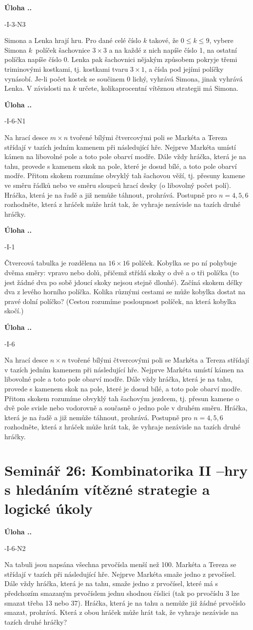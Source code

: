 \documentclass{article}
\newcounter{seminar}
\newcounter{problem}
\newcommand{\seminar}[2]{
  \clearpage
  \setcounter{seminar}{#1}
  \setcounter{problem}{0}
  \section*{Seminář #1: #2}
}
\newcommand{\source}[1]{
  \def\temp{#1}\ifx\temp\empty
  \else
    [#1]
  \fi
}
\newcommand{\problem}[4]{
  \stepcounter{problem}
  \noindent\textbf{Úloha \theseminar .\theproblem.}
    \source{#1} #3
  \bigskip
}
\begin{document}
\problem{64-I-3-N3}{}{
Simona a Lenka hrají hru. Pro dané celé číslo $k$ takové, že $0 \leq k \leq 9$, vybere Simona $k$~políček šachovnice $3 \times 3$ a na každé z nich napíše číslo 1, na ostatní políčka napíše číslo 0. Lenka pak šachovnici nějakým způsobem pokryje třemi triminovými kostkami, tj. kostkami tvaru $3 \times 1$, a čísla pod jejími políčky vynásobí. Je-li počet kostek se součinem 0 lichý, vyhrává Simona, jinak vyhrává Lenka. V závislosti na $k$ určete, kolikaprocentní vítěznou strategii má Simona.
}{
}

\problem{61-I-6-N1}{}{
Na hrací desce $m \times n$ tvořené bílými čtvercovými poli se Markéta a Tereza střídají v tazích jedním kamenem při následující hře. Nejprve Markéta umístí kámen na libovolné pole a toto pole obarví modře. Dále vždy hráčka, která je na tahu, provede s kamenem skok na pole, které je dosud bílé, a toto pole obarví modře. Přitom skokem rozumíme obvyklý tah šachovou věží, tj. přesuny kamene ve směru řádků nebo ve směru sloupců hrací desky (o libovolný počet polí). Hráčka, která je na řadě a již nemůže táhnout, prohrává. Postupně pro $n = 4, 5, 6$ rozhodněte, která z hráček může hrát tak, že vyhraje nezávisle na tazích druhé hráčky.
}{
}

\problem{62-I-1}{}{
Čtvercová tabulka je rozdělena na $16 \times 16$ políček. Kobylka se po ní pohybuje dvěma směry: vpravo nebo dolů, přičemž střídá skoky o dvě a o tři políčka (to jest žádné dva po sobě jdoucí skoky nejsou stejně dlouhé). Začíná skokem délky dva z levého horního políčka. Kolika různými cestami se může kobylka dostat na pravé dolní políčko? (Cestou rozumíme posloupnost políček, na která kobylka skočí.)
}{
}

\problem{61-I-6}{}{
Na hrací desce $n \times n$ tvořené bílými čtvercovými poli se Markéta a Tereza střídají v tazích jedním kamenem při následující hře. Nejprve Markéta umístí kámen na libovolné pole a toto pole obarví modře. Dále vždy hráčka, která je na tahu, provede s kamenem skok na pole, které je dosud bílé, a toto pole obarví modře. Přitom skokem rozumíme obvyklý tah šachovým jezdcem, tj. přesun kamene o dvě pole svisle nebo vodorovně a současně o jedno pole v druhém směru. Hráčka, která je na řadě a již nemůže táhnout, prohrává. Postupně pro $n = 4, 5, 6$ rozhodněte, která z hráček může hrát tak, že vyhraje nezávisle na tazích druhé hráčky.
}{
}


\seminar{26}{Kombinatorika II --hry s hledáním vítězné strategie a logické úkoly}

\problem{61-I-6-N2}{}{
Na tabuli jsou napsána všechna prvočísla menší než 100. Markéta a Tereza se střídají v tazích při následující hře. Nejprve Markéta smaže jedno z prvočísel. Dále vždy hráčka, která je na tahu, smaže jedno z prvočísel, které má s předchozím smazaným prvočíslem jednu shodnou číslici (tak po prvočíslu 3 lze smazat třeba 13 nebo 37). Hráčka, která je na tahu a nemůže již žádné prvočíslo smazat, prohrává. Která z obou hráček může hrát
tak, že vyhraje nezávisle na tazích druhé hráčky?
}{
}
\end{document}
